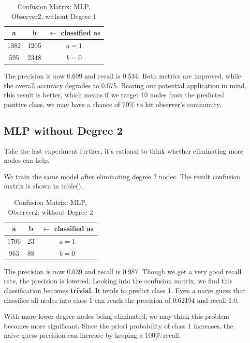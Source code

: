 \documentclass[11pt,a4paper]{article}
\begin{document}
\begin{table}[htb]
	\centering
	\caption{Confusion Matrix: MLP, Observer2, without Degree 1}
	\label{tbl:cm_o2_d1}
	\begin{tabular}{cc|c}
	\hline
a & b & \textbf{$\leftarrow$ classified as}\\	
	\hline
 1382 &1205 &    $a = 1$\\
  595 &2348 &    $b = 0$\\
	\hline
	\end{tabular}
\end{table}

The precision is now 0.699 and recall is  0.534. 
Both metrics are improved, while the overall accuracy 
degrades to 0.675. Bearing our potential application in mind, 
this result is better, which means if we target 10 nodes 
from the predicted positive class, we may have a chance
of 70\% to hit observer's community. 

\subsection{MLP without Degree 2}

Take the last experiment further, it's rational to 
think whether eliminating more nodes can help. 

We train the same model after eliminating degree 2 nodes. 
The result confusion matrix is shown in table().

\begin{table}[htb]
	\centering
	\caption{Confusion Matrix: MLP, Observer2, without Degree 2}
	\label{tbl:cm_o2_d2}
	\begin{tabular}{cc|c}
	\hline
a & b & \textbf{$\leftarrow$ classified as}\\	
	\hline
 1706 &23 &    $a = 1$\\
  963 &88 &    $b = 0$\\
	\hline
	\end{tabular}
\end{table}

The precision is now 0.639 and recall is 0.987. 
Though we get a very good recall rate, the precision 
is lowered. Looking into the confusion matrix, 
we find this classification becomes \textbf{trivial}. 
It tends to predict class 1. Even a naive guess 
that classifies all nodes into class 1 can reach 
the precision of 0.62194 and recall 1.0. 

With more lower degree nodes being eliminated, 
we may think this problem becomes more significant. 
Since the priori probability of class 1 increases, 
the naive guess precision can increase by keeping 
a 100\% recall. 
\end{document}
